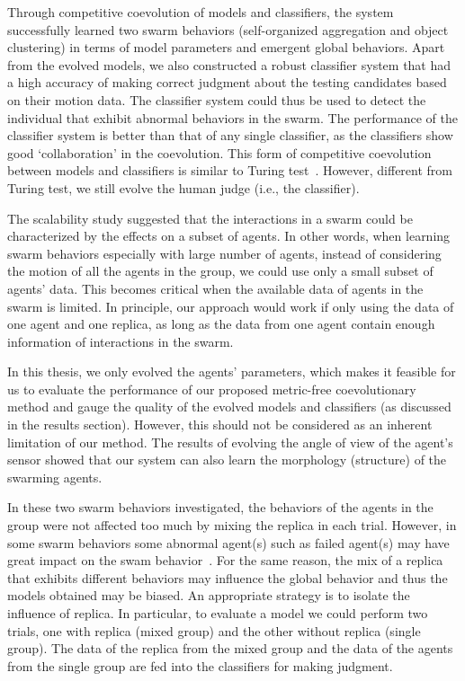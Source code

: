 Through competitive coevolution of models and classifiers, the system successfully learned two swarm behaviors (self-organized aggregation and object clustering) in terms of model parameters and emergent global behaviors. Apart from the evolved models, we also constructed a robust classifier system that had a high accuracy of making correct judgment about the testing candidates based on their motion data. The classifier system could thus be used to detect the individual that exhibit abnormal behaviors in the swarm. The performance of the classifier system is better than that of any single classifier, as the classifiers show good `collaboration' in the coevolution. This form of competitive coevolution between models and classifiers is similar to Turing test~\cite{Turing1950}. However, different from Turing test, we still evolve the human judge (i.e., the classifier). 

The scalability study suggested that the interactions in a swarm could be characterized by the effects on a subset of agents. In other words, when learning swarm behaviors especially with large number of agents, instead of considering the motion of all the agents in the group, we could use only a small subset of agents' data. This becomes critical when the available data of agents in the swarm is limited. In principle, our approach would work if only using the data of one agent and one replica, as long as the data from one agent contain enough information of interactions in the swarm.   

In this thesis, we only evolved the agents' parameters, which makes it feasible for us to evaluate the performance of our proposed metric-free coevolutionary method and gauge the quality of the evolved models and classifiers (as discussed in the results section). However, this should not be considered as an inherent limitation of our method. The results of evolving the angle of view of the agent's sensor showed that our system can also learn the morphology (structure) of the swarming agents. 

In these two swarm behaviors investigated, the behaviors of the agents in the group were not affected too much by mixing the replica in each trial. However, in some swarm behaviors some abnormal agent(s) such as failed agent(s) may have great impact on the swam behavior~\cite{Bjerknes2013}. For the same reason, the mix of a replica that exhibits different behaviors may influence the global behavior and thus the models obtained may be biased. An appropriate strategy is to isolate the influence of replica. In particular, to evaluate a model we could perform two trials, one with replica (mixed group) and the other without replica (single group). The data of the replica from the mixed group and the data of the agents from the single group are fed into the classifiers for making judgment.
